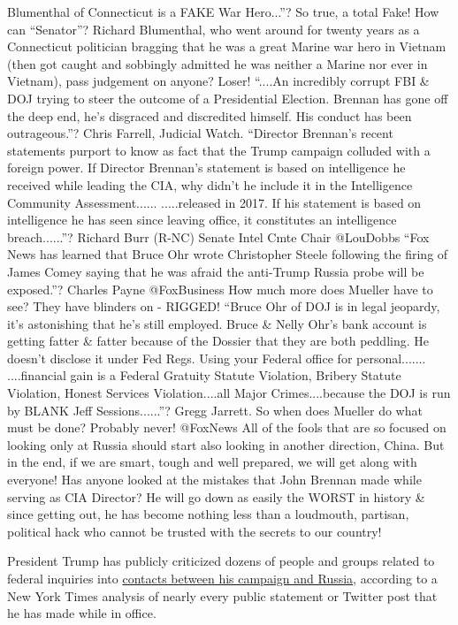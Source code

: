 Blumenthal of Connecticut is a FAKE War Hero...''? So true, a total
Fake! How can ``Senator''? Richard Blumenthal, who went around for
twenty years as a Connecticut politician bragging that he was a great
Marine war hero in Vietnam (then got caught and sobbingly admitted he
was neither a Marine nor ever in Vietnam), pass judgement on anyone?
Loser! ``....An incredibly corrupt FBI \& DOJ trying to steer the
outcome of a Presidential Election. Brennan has gone off the deep end,
he's disgraced and discredited himself. His conduct has been
outrageous.''? Chris Farrell, Judicial Watch. ``Director Brennan's
recent statements purport to know as fact that the Trump campaign
colluded with a foreign power. If Director Brennan's statement is based
on intelligence he received while leading the CIA, why didn't he include
it in the Intelligence Community Assessment...... .....released in 2017.
If his statement is based on intelligence he has seen since leaving
office, it constitutes an intelligence breach......''? Richard Burr
(R-NC) Senate Intel Cmte Chair @LouDobbs ``Fox News has learned that
Bruce Ohr wrote Christopher Steele following the firing of James Comey
saying that he was afraid the anti-Trump Russia probe will be
exposed.''? Charles Payne @FoxBusiness How much more does Mueller have
to see? They have blinders on - RIGGED! ``Bruce Ohr of DOJ is in legal
jeopardy, it's astonishing that he's still employed. Bruce \& Nelly
Ohr's bank account is getting fatter \& fatter because of the Dossier
that they are both peddling. He doesn't disclose it under Fed Regs.
Using your Federal office for personal....... ....financial gain is a
Federal Gratuity Statute Violation, Bribery Statute Violation, Honest
Services Violation....all Major Crimes....because the DOJ is run by
BLANK Jeff Sessions......''? Gregg Jarrett. So when does Mueller do what
must be done? Probably never! @FoxNews All of the fools that are so
focused on looking only at Russia should start also looking in another
direction, China. But in the end, if we are smart, tough and well
prepared, we will get along with everyone! Has anyone looked at the
mistakes that John Brennan made while serving as CIA Director? He will
go down as easily the WORST in history \& since getting out, he has
become nothing less than a loudmouth, partisan, political hack who
cannot be trusted with the secrets to our country!

President Trump has publicly criticized dozens of people and groups
related to federal inquiries into
\href{https://www.nytimes3xbfgragh.onion/interactive/2019/01/26/us/politics/trump-contacts-russians-wikileaks.html}{contacts
between his campaign and Russia}, according to a New York Times analysis
of nearly every public statement or Twitter post that he has made while
in office.

